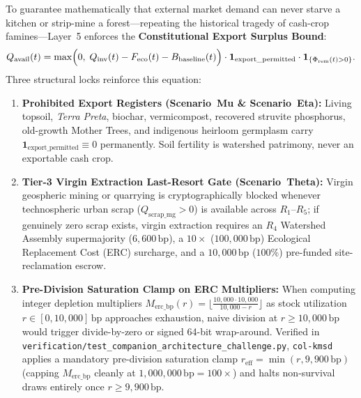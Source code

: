 To guarantee mathematically that external market demand can never starve a kitchen or strip-mine a
forest---repeating the historical tragedy of cash-crop famines---Layer~5 enforces the
\textbf{Constitutional Export Surplus Bound}:
\begin{equation}
    Q_{\mathrm{avail}}(t) = \max\Bigl(0,\; Q_{\mathrm{inv}}(t) - F_{\mathrm{eco}}(t) - B_{\mathrm{baseline}}(t)\Bigr)
    \cdot \mathbf{1}_{\mathrm{export\_permitted}} \cdot \mathbf{1}_{\{\Phi_{\mathrm{rem}}(t) > 0\}}.
\end{equation}
Three structural locks reinforce this equation:
\begin{enumerate}
    \item \textbf{Prohibited Export Registers (Scenario~Mu \& Scenario~Eta):} Living topsoil,
    \textit{Terra Preta}, biochar, vermicompost, recovered struvite phosphorus, old-growth Mother
    Trees, and indigenous heirloom germplasm carry $\mathbf{1}_{\mathrm{export\_permitted}} \equiv 0$
    permanently. Soil fertility is watershed patrimony, never an exportable cash crop.
    \item \textbf{Tier-3 Virgin Extraction Last-Resort Gate (Scenario~Theta):} Virgin geospheric
    mining or quarrying is cryptographically blocked whenever technospheric urban scrap
    ($Q_{\mathrm{scrap\_mg}} > 0$) is available across $R_1\text{--}R_5$; if genuinely zero scrap
    exists, virgin extraction requires an $R_4$ Watershed Assembly supermajority ($6{,}600\,\mathrm{bp}$),
    a $10\times$ ($100{,}000\,\mathrm{bp}$) Ecological Replacement Cost (ERC) surcharge, and a
    $10{,}000\,\mathrm{bp}$ ($100\%$) pre-funded site-reclamation escrow.
    \item \textbf{Pre-Division Saturation Clamp on ERC Multipliers:} When computing integer
    depletion multipliers $M_{\mathrm{erc\_bp}}(r) = \lfloor \frac{10{,}000 \cdot 10{,}000}{10{,}000 - r} \rfloor$
    as stock utilization $r \in [0, 10{,}000]\,\mathrm{bp}$ approaches exhaustion, naive division at
    $r \ge 10{,}000\,\mathrm{bp}$ would trigger divide-by-zero or signed 64-bit wrap-around. Verified
    in \texttt{verification/test\_companion\_architecture\_challenge.py}, \texttt{col-kmsd} applies
    a mandatory pre-division saturation clamp $r_{\mathrm{eff}} = \min(r, 9{,}900\,\mathrm{bp})$
    (capping $M_{\mathrm{erc\_bp}}$ cleanly at $1{,}000{,}000\,\mathrm{bp} = 100\times$) and halts
    non-survival draws entirely once $r \ge 9{,}900\,\mathrm{bp}$.
\end{enumerate}

